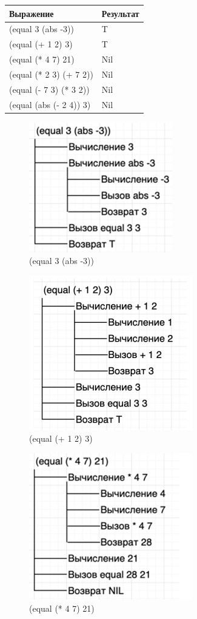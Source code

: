 \documentclass[a4paper, 12pt]{article}
\begin{document}
\hspace*{40mm}\begin{tabular}{ | l | l | }
	\hline
	\textbf{Выражение} & \textbf{Результат} \\ \hline
	(equal 3 (abs -3)) & T \\ \hline
	(equal (+ 1 2) 3) & T \\ \hline
	(equal (* 4 7) 21) & Nil \\ \hline
	(equal (* 2 3) (+ 7 2)) & Nil \\ \hline
	(equal (- 7 3) (* 3 2)) & Nil \\ \hline
	(equal (abs (- 2 4)) 3) & Nil \\ \hline
\end{tabular}
\begin{figure}[h!]
	\centering \includegraphics[scale=2.5]{1}
	\centering\caption{(equal 3 (abs -3))}
\end{figure}
\begin{figure}[h!]
	\centering \includegraphics[scale=2.5]{2}
	\centering\caption{(equal (+ 1 2) 3)}
\end{figure}
\clearpage
\newpage
\begin{figure}[h!]
	\centering \includegraphics[scale=2.5]{3}
	\centering\caption{(equal (* 4 7) 21)}
\end{figure}
\end{document}
